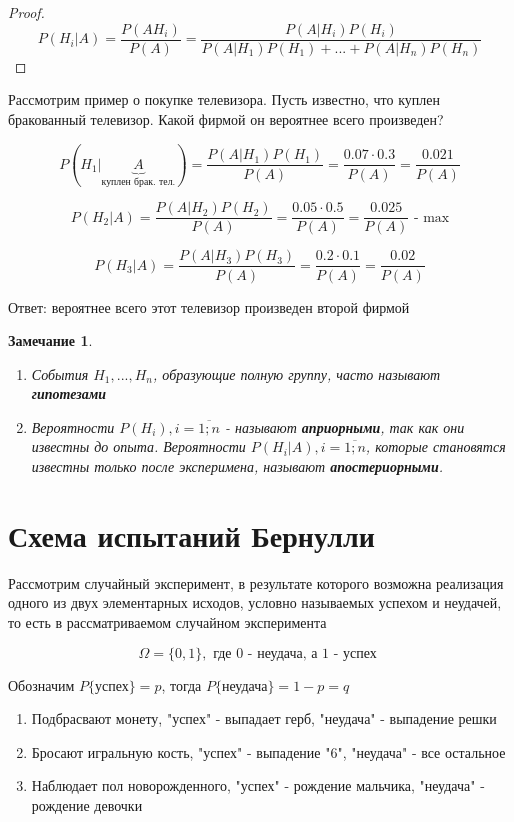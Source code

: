 \documentclass[a4paper, 14pt]{report}
\newtheorem{note}{Замечание}[chapter]
\begin{document}
\begin{proof}
    $$
    P(H_i|A) = \frac{P(A H_i)}{P(A)} = \frac{P(A|H_i) P(H_i)}{P(A|H_1) P(H_1) + ... + P(A|H_n) P(H_n) }
    $$
\end{proof}

Рассмотрим пример о покупке телевизора. Пусть известно, что куплен бракованный телевизор. Какой фирмой он вероятнее всего произведен?

$$
P(H_1| \underbrace{A}_\text{куплен брак. тел.}) = \frac{P(A|H_1)P(H_1)}{P(A)} = \frac{0.07 \cdot 0.3}{P(A)} = \frac{0.021}{P(A)}
$$

$$
P(H_2|A) = \frac{P(A|H_2)P(H_2)}{P(A)} = \frac{0.05 \cdot 0.5}{P(A)} = \frac{0.025}{P(A)} \text{ - max}
$$

$$
P(H_3|A) = \frac{P(A|H_3)P(H_3)}{P(A)} = \frac{0.2 \cdot 0.1}{P(A)} = \frac{0.02}{P(A)}
$$

Ответ: вероятнее всего этот телевизор произведен второй фирмой

\begin{note}
    \begin{enumerate}
        \item События $H_1,...,H_n$, образующие полную группу, часто называют \textbf{гипотезами}
        \item Вероятности $P(H_i), i = \overline{1;n}$ - называют \textbf{априорными}, так как они известны до опыта. Вероятности $P(H_i|A), i = \overline{1;n}$, которые становятся известны только после эксперимена, называют \textbf{апостериорными}.
    \end{enumerate}
\end{note}

\section{Схема испытаний Бернулли}

Рассмотрим случайный эксперимент, в результате которого возможна реализация одного из двух элементарных исходов, условно называемых успехом и неудачей, то есть в рассматриваемом случайном эксперимента

$$
\Omega = \{ 0,1 \}, \text{ где 0 - неудача, а 1 - успех }
$$

Обозначим $P\{\text{успех}\} = p$, тогда $P\{\text{неудача}\} = 1 - p = q$

\begin{enumerate}
    \item Подбрасвают монету, "успех" - выпадает герб, "неудача" - выпадение решки
    \item Бросают игральную кость, "успех" - выпадение "6", "неудача" - все остальное
    \item Наблюдает пол новорожденного, "успех" - рождение мальчика, "неудача" - рождение девочки
\end{enumerate}
\end{document}
